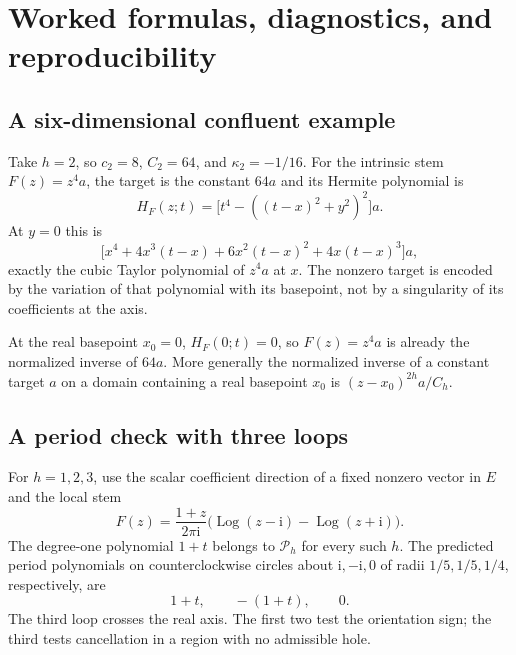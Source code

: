 \documentclass[11pt,a4paper]{article}
\numberwithin{equation}{section}
\theoremstyle{definition}
\theoremstyle{remark}
\newcommand{\ii}{\mathrm i}
\newcommand{\Pspace}{\mathscr P_h}
\begin{document}
\section{Worked formulas, diagnostics, and reproducibility}
\label{sec:verification}

\subsection{A six-dimensional confluent example}

Take $h=2$, so $c_2=8$, $C_2=64$, and $\kappa_2=-1/16$. For the intrinsic
stem $F(z)=z^4a$, the target is the constant $64a$ and its Hermite polynomial is
\begin{equation}\label{eq:example-H}
 H_F(z;t)=\bigl[t^4-((t-x)^2+y^2)^2\bigr]a.
\end{equation}
At $y=0$ this is
\[
 \bigl[x^4+4x^3(t-x)+6x^2(t-x)^2+4x(t-x)^3\bigr]a,
\]
exactly the cubic Taylor polynomial of $z^4a$ at $x$. The nonzero target is
encoded by the variation of that polynomial with its basepoint, not by a
singularity of its coefficients at the axis.

At the real basepoint $x_0=0$, $H_F(0;t)=0$, so $F(z)=z^4a$ is already the
normalized inverse of $64a$. More generally the normalized inverse of a
constant target $a$ on a domain containing a real basepoint $x_0$ is
$(z-x_0)^{2h}a/C_h$.

\subsection{A period check with three loops}

For $h=1,2,3$, use the scalar coefficient direction of a fixed nonzero vector
in $E$ and the local stem
\begin{equation}\label{eq:numerical-stem}
 F(z)=\frac{1+z}{2\pi\ii}
             \bigl(\operatorname{Log}(z-\ii)
                         -\operatorname{Log}(z+\ii)\bigr).
\end{equation}
The degree-one polynomial $1+t$ belongs to $\Pspace$ for every such $h$.
The predicted period polynomials on counterclockwise circles about
$\ii,-\ii,0$ of radii $1/5,1/5,1/4$, respectively, are
\begin{equation}\label{eq:test-periods}
 1+t,\qquad -(1+t),\qquad 0.
\end{equation}
The third loop crosses the real axis. The first two test the orientation sign;
the third tests cancellation in a region with no admissible hole.
\end{document}
